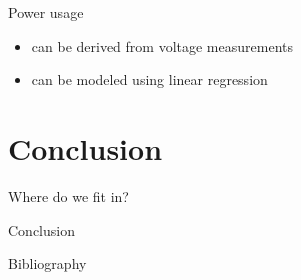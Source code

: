 \documentclass[presentation, bigger]{beamer}
\begin{document}
\begin{frame}[label=sec-3-5]{Power usage}
\begin{itemize}
\item can be derived from voltage measurements
\item can be modeled using linear regression
\end{itemize}
\end{frame}
\section{Conclusion}
\label{sec-4}
\begin{frame}[label=sec-4-1]{Where do we fit in?}
\end{frame}
\begin{frame}[label=sec-4-2]{Conclusion}
\end{frame}
\begin{frame}[label=sec-4-3]{Bibliography}
\nocite{*}
\printbibliography
\end{frame}
\end{document}
